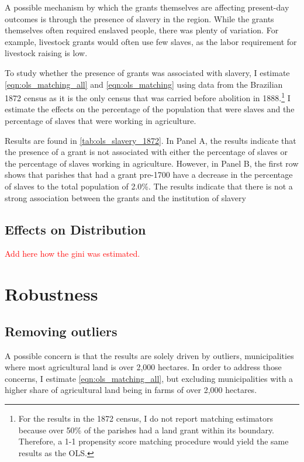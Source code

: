 \documentclass[11pt]{article}
\newcommand{\red}[1]{\textcolor{red}{#1}}
\begin{document}
A possible mechanism by which the grants themselves are affecting present-day outcomes is through the presence of slavery in the region. 
While the grants themselves often required enslaved people, there was plenty of variation.
For example, livestock grants would often use few slaves, as the labor requirement for livestock raising is low.

To study whether the presence of grants was associated with slavery, I estimate \autoref{eqn:ols_matching_all} and \autoref{eqn:ols_matching} using data from the Brazilian 1872 census as it is the only census that was carried before abolition in 1888.\footnote{For the results in the 1872 census, I do not report matching estimators because over 50\% of the parishes had a land grant within its boundary. 
Therefore, a 1-1 propensity score matching procedure would yield the same results as the OLS.}
I estimate the effects on the percentage of the population that were slaves and the percentage of slaves that were working in agriculture. 

Results are found in \autoref{tab:ols_slavery_1872}.
In Panel A, the results indicate that the presence of a grant is not associated with either the percentage of slaves or the percentage of slaves working in agriculture. 
However, in Panel B, the first row shows that parishes that had a grant pre-1700 have a decrease in the percentage of slaves to the total population of 2.0\%. 
The results indicate that there is not a strong association between the grants and the institution of slavery 

\subsection{Effects on Distribution}

\red{Add here how the gini was estimated.}


\section{Robustness}
\label{sec:robustness}
\subsection{Removing outliers}

A possible concern is that the results are solely driven by outliers, municipalities where most agricultural land is over 2,000 hectares. 
In order to address those concerns, I estimate \autoref{eqn:ols_matching_all}, but excluding municipalities with a higher share of agricultural land being in farms of over 2,000 hectares.
\end{document}
